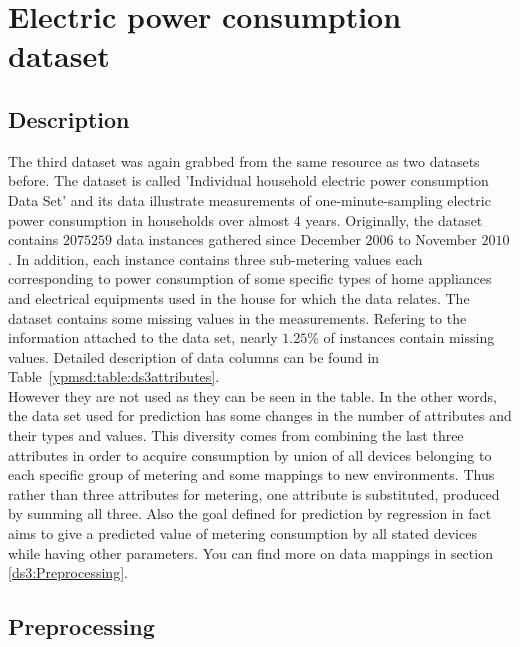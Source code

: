 \section{Electric power consumption dataset}
\subsection{Description}
The third dataset was again grabbed from the same resource as two datasets before.
The dataset is called 'Individual household electric power consumption Data
Set\cite{ds:household}' and its data illustrate measurements of
one-minute-sampling electric power consumption in households over almost $4$
years. Originally, the dataset contains $2075259$ data instances gathered since
December $2006$ to November $2010$. In addition, each instance contains three
sub-metering values each corresponding to power consumption of some specific types
of home appliances and electrical equipments used in the house for which the
data relates. The dataset contains some missing values in the measurements.
Refering to the information attached to the data set, nearly $1.25\%$ of
instances contain missing values. Detailed description of data columns can be
found in Table~\ref{ypmsd:table:ds3attributes}.\\
However they are not used as they can be seen in the table. In the other words,
the data set used for prediction has some changes in the number of attributes
and their types and values.
This diversity comes from combining the last three attributes in order to acquire consumption by union of all devices
belonging to each specific group of metering and some mappings to new
environments.
Thus rather than three attributes for metering, one attribute is substituted, produced by summing all three. Also the
goal defined for prediction by regression in fact aims to give a predicted value
of metering consumption by all stated devices while having other parameters.
You can find more on data mappings in section \ref{ds3:Preprocessing}.








\subsection{Preprocessing\label{ds3:Preprocessing}}

